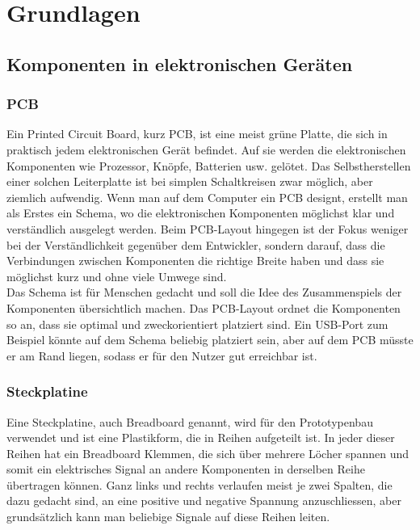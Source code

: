 \documentclass[12pt, a4paper]{report}
\begin{document}
\chapter{Grundlagen}
\section{Komponenten in elektronischen Geräten}
\subsection{PCB}
Ein Printed Circuit Board, kurz PCB, ist eine meist grüne Platte, die sich in praktisch jedem elektronischen Gerät befindet. Auf sie werden die elektronischen Komponenten wie Prozessor, Knöpfe, Batterien usw. gelötet. Das Selbstherstellen einer solchen Leiterplatte ist bei simplen Schaltkreisen zwar möglich, aber ziemlich aufwendig. Wenn man auf dem Computer ein PCB designt, erstellt man als Erstes ein Schema, wo die elektronischen Komponenten möglichst klar und verständlich ausgelegt werden. Beim PCB-Layout hingegen ist der Fokus weniger bei der Verständlichkeit gegenüber dem Entwickler, sondern darauf, dass die Verbindungen zwischen Komponenten die richtige Breite haben und dass sie möglichst kurz und ohne viele Umwege sind.
\\[\medskipamount]
Das Schema ist für Menschen gedacht und soll die Idee des Zusammenspiels der Komponenten übersichtlich machen. Das PCB-Layout ordnet die Komponenten so an, dass sie optimal und zweckorientiert platziert sind. Ein USB-Port zum Beispiel könnte auf dem Schema beliebig platziert sein, aber auf dem PCB müsste er am Rand liegen, sodass er für den Nutzer gut erreichbar ist.
\subsection{Steckplatine}
Eine Steckplatine, auch Breadboard genannt, wird für den Prototypenbau verwendet und ist eine Plastikform, die in Reihen aufgeteilt ist. In jeder dieser Reihen hat ein Breadboard Klemmen, die sich über mehrere Löcher spannen und somit ein elektrisches Signal an andere Komponenten in derselben Reihe übertragen können.
Ganz links und rechts verlaufen meist je zwei Spalten, die dazu gedacht sind, an eine positive und negative Spannung anzuschliessen, aber grundsätzlich kann man beliebige Signale auf diese Reihen leiten.
\end{document}
